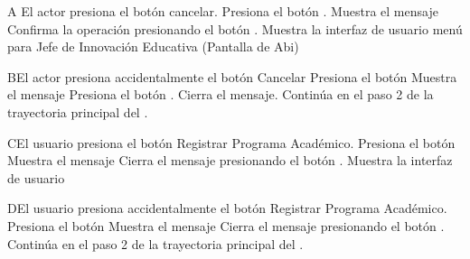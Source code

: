 

\begin{UCtrayectoriaA}{A}{ El actor presiona el botón cancelar.}
	\UCpaso[\UCactor] Presiona el botón .
    \UCpaso Muestra el mensaje 
    \UCpaso[\UCactor] Confirma la operación presionando el botón .
    \UCpaso Muestra la interfaz de usuario menú para Jefe de Innovación Educativa (Pantalla de Abi)
\end{UCtrayectoriaA}



\begin{UCtrayectoriaA}{B}{El actor presiona accidentalmente el botón Cancelar}
	\UCpaso[\UCactor] Presiona el botón 
    \UCpaso Muestra el mensaje 
    \UCpaso[\UCactor] Presiona el botón .
    \UCpaso Cierra el mensaje.
    \UCpaso Continúa en el paso 2 de la trayectoria principal del .
\end{UCtrayectoriaA}


\begin{UCtrayectoriaA}{C}{El usuario presiona el botón Registrar Programa Académico.}
	\UCpaso[\UCactor] Presiona el botón 
    \UCpaso Muestra el mensaje 
    \UCpaso[\UCactor] Cierra el mensaje presionando el botón .
\UCpaso Muestra la interfaz de usuario 
\end{UCtrayectoriaA}


\begin{UCtrayectoriaA}{D}{El usuario presiona accidentalmente el botón Registrar Programa Académico.}
	\UCpaso[\UCactor] Presiona el botón 
    \UCpaso Muestra el mensaje 
    \UCpaso[\UCactor] Cierra el mensaje presionando el botón .
    \UCpaso Continúa en el paso 2 de la trayectoria principal del .
\end{UCtrayectoriaA}


